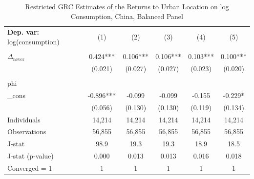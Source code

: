 \begin{table}[htbp] \centering \begin{threeparttable}
 \caption{Restricted GRC Estimates of the Returns to Urban Location on log Consumption, China, Balanced Panel} 
 \label{tab:GRC_CHN_consumption_urban_bal} 
\begin{tabular}{l ccccc} \toprule  \textbf{Dep. var:}  log(consumption) 
                    &\multicolumn{1}{c}{(1)}   &\multicolumn{1}{c}{(2)}   &\multicolumn{1}{c}{(3)}   &\multicolumn{1}{c}{(4)}   &\multicolumn{1}{c}{(5)}   \\
                    &               &               &               &               &               \\
\addlinespace
$\Delta_{\text{never}}$&       0.424***&       0.106***&       0.106***&       0.103***&       0.100***\\
                    &     (0.021)   &     (0.027)   &     (0.027)   &     (0.023)   &     (0.020)   \\
                    &               &               &               &               &               \\
\addlinespace
phi                 &               &               &               &               &               \\
_cons               &      -0.896***&      -0.099   &      -0.099   &      -0.155   &      -0.229*  \\
                    &     (0.056)   &     (0.130)   &     (0.130)   &     (0.119)   &     (0.134)   \\
\addlinespace
Individuals         &      14,214   &      14,214   &      14,214   &      14,214   &      14,214   \\
Observations        &      56,855   &      56,855   &      56,855   &      56,855   &      56,855   \\
J-stat              &        98.9   &        19.3   &        19.3   &        18.9   &        18.5   \\
J-stat (p-value)    &       0.000   &       0.013   &       0.013   &       0.016   &       0.018   \\
Converged = 1       &           1   &           1   &           1   &           1   &           1   \\

\end{tabular}
\end{threeparttable}
\end{table}
